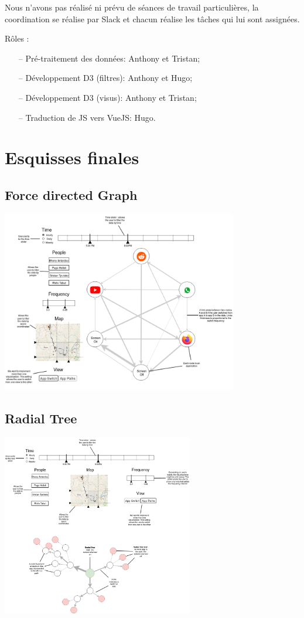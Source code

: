 \documentclass[a4paper, 11pt]{article}
\begin{document}
    Nous n'avons pas réalisé ni prévu de séances de travail particulières, la coordination se réalise par Slack et chacun réalise les tâches qui lui sont assignées.
    
    Rôles :
    \begin{itemize}
    \item[--] Pré-traitement des données: Anthony et Tristan;
    \item[--] Développement D3 (filtres): Anthony et Hugo;
    \item[--] Développement D3 (visus): Anthony et Tristan;
    \item[--] Traduction de JS vers VueJS: Hugo.
    \end{itemize}

    \section{Esquisses finales}
        \subsection{Force directed Graph}
		\begin{center} \includegraphics[height=300px]{sketches/AppGraph} \end{center}
		
		\subsection{Radial Tree}
		\begin{center} \includegraphics[height=300px]{sketches/AppRadTree} \end{center}
\end{document}
